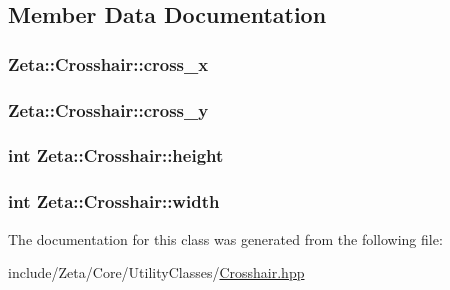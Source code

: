 \subsection{Member Data Documentation}
\hypertarget{classZeta_1_1Crosshair_a44ec60aa2174dac29978ded67f854b7a}{
\subsubsection[{cross\+\_\+x}]{ Zeta\+::\+Crosshair\+::cross\+\_\+x\hspace{0.3cm}{\ttfamily [protected]}}}\label{classZeta_1_1Crosshair_a44ec60aa2174dac29978ded67f854b7a}
\hypertarget{classZeta_1_1Crosshair_adfcdf50feef48497972cae1467a59260}{
\subsubsection[{cross\+\_\+y}]{ Zeta\+::\+Crosshair\+::cross\+\_\+y\hspace{0.3cm}{\ttfamily [protected]}}}\label{classZeta_1_1Crosshair_adfcdf50feef48497972cae1467a59260}
\hypertarget{classZeta_1_1Crosshair_a18b73261c9cebb4413675105c0ff25a9}{
\subsubsection[{height}]{\setlength{\rightskip}{0pt plus 5cm}int Zeta\+::\+Crosshair\+::height\hspace{0.3cm}{\ttfamily [protected]}}}\label{classZeta_1_1Crosshair_a18b73261c9cebb4413675105c0ff25a9}
\hypertarget{classZeta_1_1Crosshair_aabcdae88e34ee8532c8d755adc9504c4}{
\subsubsection[{width}]{\setlength{\rightskip}{0pt plus 5cm}int Zeta\+::\+Crosshair\+::width\hspace{0.3cm}{\ttfamily [protected]}}}\label{classZeta_1_1Crosshair_aabcdae88e34ee8532c8d755adc9504c4}


The documentation for this class was generated from the following file\+:\begin{DoxyCompactItemize}
\item 
include/\+Zeta/\+Core/\+Utility\+Classes/\hyperlink{Crosshair_8hpp}{Crosshair.\+hpp}\end{DoxyCompactItemize}
